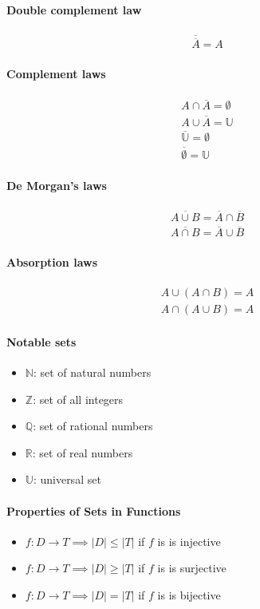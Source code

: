 \documentclass[a4paper]{article}
\newcommand{\N}{\mathbb{N}}
\newcommand{\Z}{\mathbb{Z}}
\newcommand{\Q}{\mathbb{Q}}
\newcommand{\R}{\mathbb{R}}
\newcommand{\U}{\mathbb{U}}
\begin{document}
\paragraph{Double complement law}
\begin{align*}
  \overline{\overline{A}}  =  A
\end{align*}
\paragraph{Complement laws}
\begin{align*}
A \cap \overline{A}  =  \emptyset \\
  A \cup \overline{A}  =  \mathbb U \\
\overline{\mathbb{U}}  =  \emptyset \\
  \overline{\emptyset}  =  \mathbb U
\end{align*}
\paragraph{De Morgan's laws}
\begin{align*}
\overline{A \cup B}  =  \overline{A} \cap \overline{B} \\
\overline{A \cap B}  =  \overline{A} \cup \overline{B}
\end{align*}
\paragraph{Absorption laws}
\begin{align*}
  A \cup (A \cap B)  =  A \\
  A \cap (A \cup B)  =  A
\end{align*}
\paragraph{Notable sets}
\begin{itemize}
  \item $\N$: set of natural numbers
  \item $\Z$: set of all integers
  \item $\Q$: set of rational numbers
  \item $\R$: set of real numbers
  \item $\U$: universal set
\end{itemize}
\paragraph{Properties of Sets in Functions}
\begin{itemize}
  \item $f: D \to T \implies |D| \leq |T|$ if $f$ is is injective
  \item $f: D \to T \implies |D| \geq |T|$ if $f$ is is surjective
  \item $f: D \to T \implies |D| = |T|$ if $f$ is is bijective
\end{itemize}
\end{document}
